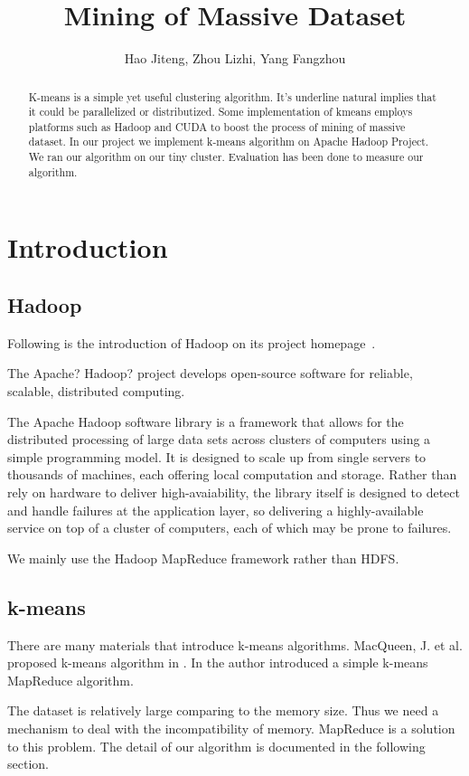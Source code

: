 \documentclass[a4paper,11pt]{article}
\title{Mining of Massive Dataset}
\author{Hao Jiteng, Zhou Lizhi, Yang Fangzhou}
\begin{document}
\maketitle

\begin{abstract}
K-means is a simple yet useful clustering algorithm. It's underline natural
implies that it could be parallelized or distributized. Some implementation of
kmeans employs platforms such as Hadoop and CUDA to boost the process of mining
of massive dataset.
In our project we implement k-means algorithm on Apache Hadoop Project. We ran
our algorithm on our tiny cluster. Evaluation has been done to measure our
algorithm.
\end{abstract}

\section{Introduction}
\subsection{Hadoop}
Following is the introduction of Hadoop on its project
homepage~\cite{apache:hadoop}.

The Apache? Hadoop? project develops open-source software for reliable,
scalable, distributed computing.

The Apache Hadoop software library is a framework that allows for the
distributed processing of large data sets across clusters of computers using a
simple programming model. It is designed to scale up from single servers to
thousands of machines, each offering local computation and storage. Rather than
rely on hardware to deliver high-avaiability, the library itself is designed to
detect and handle failures at the application layer, so delivering a
highly-available service on top of a cluster of computers, each of which may
be prone to failures.

We mainly use the Hadoop MapReduce framework rather than HDFS.

\subsection{k-means}
There are many materials that introduce k-means
algorithms. MacQueen, J. et al. proposed k-means algorithm in
\cite{algo:kmeans1}. In \cite{algo:kmeans2} the author introduced a simple
k-means MapReduce algorithm.

The dataset is relatively large comparing to the memory size. Thus we need a
mechanism to deal with the incompatibility of memory. MapReduce is a solution to
this problem. The detail of our algorithm is documented in the following
section.
\end{document}
